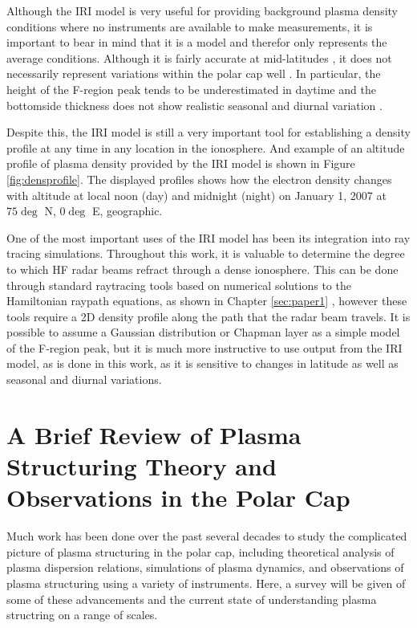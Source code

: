 Although the IRI model is very useful for providing background plasma density conditions where no instruments are available to make measurements, it is important to bear in mind that it is a model and therefor only represents the average conditions.  Although it is fairly accurate at mid-latitudes \citep{Coisson2006,Bilitza2012}, it does not necessarily represent variations within the polar cap well \citep{Themens2014,Makarevich2015}.  In particular, the height of the F-region peak tends to be underestimated in daytime and the bottomside thickness does not show realistic seasonal and diurnal variation \citep{Themens2014}.  

Despite this, the IRI model is still a very important tool for establishing a density profile at any time in any location in the ionosphere.  And example of an altitude profile of plasma density provided by the IRI model is shown in Figure \ref{fig:densprofile}.  The displayed profiles shows how the electron density changes with altitude at local noon (day) and midnight (night) on January 1, 2007 at \(75\deg\) N, \(0\deg\) E, geographic.

One of the most important uses of the IRI model has been its integration into ray tracing simulations.  Throughout this work, it is valuable to determine the degree to which HF radar beams refract through a dense ionosphere.  This can be done through standard raytracing tools based on numerical solutions to the Hamiltonian raypath equations, as shown in Chapter \ref{sec:paper1} \citep{Haselgrove1963,Jones1975}, however these tools require a 2D density profile along the path that the radar beam travels.  It is possible to assume a Gaussian distribution or Chapman layer as a simple model of the F-region peak, but it is much more instructive to use output from the IRI model, as is done in this work, as it is sensitive to changes in latitude as well as seasonal and diurnal variations.

\section{A Brief Review of Plasma Structuring Theory and Observations in the Polar Cap}
Much work has been done over the past several decades to study the complicated picture of plasma structuring in the polar cap, including theoretical analysis of plasma dispersion relations, simulations of plasma dynamics, and observations of plasma structuring using a variety of instruments.  Here, a survey will be given of some of these advancements and the current state of understanding plasma structring on a range of scales.

